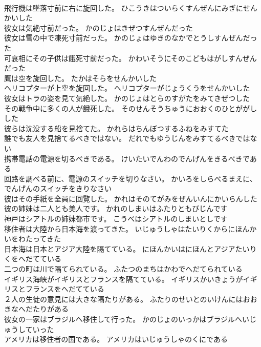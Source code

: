 \documentclass[8pt]{extreport}
\begin{document}
\begin{CJK}{UTF8}{min}
\\	飛行機は墜落寸前に右に旋回した。	ひこうきはついらくすんぜんにみぎにせんかいした 
\\	彼女は気絶寸前だった。	かのじょはきぜつすんぜんだった 
\\	彼女は雪の中で凍死寸前だった。	かのじょはゆきのなかでとうしすんぜんだった 
\\	可哀相にその子供は餓死寸前だった。	かわいそうにそのこどもはがしすんぜんだった 
\\	鷹は空を旋回した。	たかはそらをせんかいした 
\\	ヘリコプターが上空を旋回した。	ヘリコプターがじょうくうをせんかいした 
\\	彼女はトラの姿を見て気絶した。	かのじょはとらのすがたをみてきぜつした 
\\	その戦争中に多くの人が餓死した。	そのせんそうちゅうにおおくのひとががしした 
\\	彼らは沈没する船を見捨てた。	かれらはちんぼつするふねをみすてた 
\\	誰でも友人を見捨てるべきではない。	だれでもゆうじんをみすてるべきではない 
\\	携帯電話の電源を切るべきである。	けいたいでんわのでんげんをきるべきである 
\\	回路を調べる前に、電源のスイッチを切りなさい。	かいろをしらべるまえに、でんげんのスイッチをきりなさい 
\\	彼はその手紙を全員に回覧した。	かれはそのてがみをぜんいんにかいらんした 
\\	彼の姉妹は二人とも美人です。	かれのしまいはふたりともびじんです 
\\	神戸はシアトルの姉妹都市です。	こうべはシアトルのしまいとしです 
\\	移住者は大陸から日本海を渡ってきた。	いじゅうしゃはたいりくからにほんかいをわたってきた 
\\	日本海は日本とアジア大陸を隔てている。	にほんかいはにほんとアジアたいりくをへだてている 
\\	二つの町は川で隔てられている。	ふたつのまちはかわでへだてられている 
\\	イギリス海峡がイギリスとフランスを隔てている。	イギリスかいきょうがイギリスとフランスをへだてている 
\\	２人の生徒の意見には大きな隔たりがある。	ふたりのせいとのいけんにはおおきなへだたりがある 
\\	彼女の一家はブラジルへ移住して行った。	かのじょのいっかはブラジルへいじゅうしていった 
\\	アメリカは移住者の国である。	アメリカはいじゅうしゃのくにである 

\end{CJK}
\end{document}
